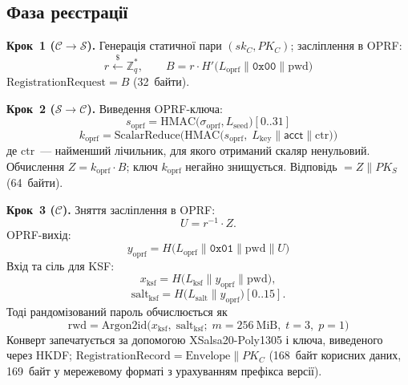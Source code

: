 \documentclass{llncs}
\newcommand{\acct}{\mathsf{acct}}
\newcommand{\sigoprf}{\sigma_{\mathrm{oprf}}}
\newcommand{\Label}[1]{L_{\mathrm{#1}}}
\begin{document}
\subsection{Фаза реєстрації}

\textbf{Крок~1 ($\mathcal{C} \to \mathcal{S}$).} Генерація статичної
пари $(sk_C, PK_C)$; засліплення в OPRF:
\begin{equation}
  r \xleftarrow{\$} \mathbb{Z}_q^*, \qquad
  B = r \cdot H'\!\bigl(\Label{oprf} \| \mathtt{0x00} \| \mathrm{pwd}\bigr)
  \label{eq:reg-blind}
\end{equation}
$\mathrm{RegistrationRequest} = B$ (32~байти).

\textbf{Крок~2 ($\mathcal{S} \to \mathcal{C}$).} Виведення OPRF-ключа:
\begin{equation}
  s_{\mathrm{oprf}} =
  \mathrm{HMAC}\!\bigl(\sigoprf, \Label{seed}\bigr)[0..31]
  \label{eq:oprf-seed}
\end{equation}
\begin{equation}
  k_{\mathrm{oprf}} = \mathrm{ScalarReduce}\!\bigl(
    \mathrm{HMAC}\!\bigl(
      s_{\mathrm{oprf}},\;
      \Label{key} \| \acct \| \mathrm{ctr}
    \bigr)\bigr)
  \label{eq:oprf-key}
\end{equation}
де $\mathrm{ctr}$~--- найменший лічильник, для якого отриманий скаляр
ненульовий. Обчислення $Z = k_{\mathrm{oprf}} \cdot B$; ключ
$k_{\mathrm{oprf}}$ негайно знищується. Відповідь $= Z \| PK_S$
(64~байти).

\textbf{Крок~3 ($\mathcal{C}$).} Зняття засліплення в OPRF:
\[
  U = r^{-1} \cdot Z.
\]
OPRF-вихід:
\begin{equation}
  y_{\mathrm{oprf}} = H\!\bigl(\Label{oprf} \|
  \mathtt{0x01} \| \mathrm{pwd} \| U\bigr)
  \label{eq:oprf-output}
\end{equation}
Вхід та сіль для KSF:
\begin{equation}
  x_{\mathrm{ksf}} = H\!\bigl(
    \Label{ksf} \|
    y_{\mathrm{oprf}} \| \mathrm{pwd}\bigr),
\end{equation}
\begin{equation}
  \mathrm{salt}_{\mathrm{ksf}} =
  H\!\bigl(\Label{salt} \|
  y_{\mathrm{oprf}}\bigr)[0..15].
\end{equation}
Тоді рандомізований пароль обчислюється як
\begin{equation}
  \mathrm{rwd} = \mathrm{Argon2id}\!\bigl(
    x_{\mathrm{ksf}},\; \mathrm{salt}_{\mathrm{ksf}};\;
    m = 256~\mathrm{MiB},\; t = 3,\; p = 1\bigr)
  \label{eq:rwd}
\end{equation}
Конверт запечатується за допомогою XSalsa20-Poly1305 і ключа,
виведеного через HKDF;
$\mathrm{RegistrationRecord} = \mathrm{Envelope} \| PK_C$
(168~байт корисних даних, 169~байт у мережевому форматі з урахуванням префікса версії).
\end{document}
